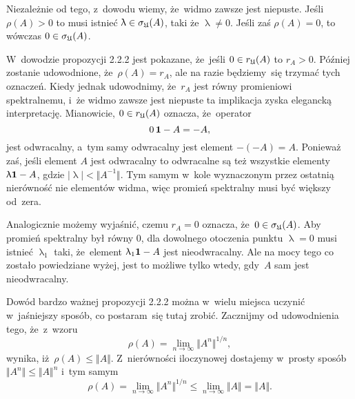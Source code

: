 \documentclass[a4paper,11pt]{article}
\renewcommand{\lambda}{\uplambda}
\begin{document}
Niezależnie od tego, z~dowodu wiemy, że~widmo zawsze jest niepuste. Jeśli
$\rho( A ) > 0$ to musi istnieć $\lambda \in \sigma_{ \Ufrak }( A )$, taki że $\lambda \neq 0$. Jeśli
zaś $\rho( A ) = 0$, to wówczas $0 \in \sigma_{ \mathfrak{U} }( A )$.

\VerSpaceFour





\noindent
{} W~dowodzie propozycji 2.2.2 jest pokazane, że~jeśli
$0 \in r_{ \mathfrak{U} }( A )$ to $r_{ A } > 0$. Później zostanie udowodnione,
że~$\rho( A ) = r_{ A }$, ale na razie będziemy~się trzymać tych oznaczeń.
Kiedy jednak udowodnimy, że~$r_{ A }$ jest równy promieniowi spektralnemu,
i~że widmo zawsze jest niepuste ta implikacja zyska elegancką interpretację.
Mianowicie, $0 \in r_{ \mathfrak{U} }( A )$ oznacza, że~operator
\begin{equation}
  \label{eq:Bratteli-Robinson-Operator-Algebras-ETC-Vol-I-s01-39}
  0 \, \mathbf{1} - A = -A,
\end{equation}
jest odwracalny, a~tym samy odwracalny jest element $-( -A ) = A$. Ponieważ
zaś, jeśli element $A$ jest odwracalny to odwracalne są też wszystkie
elementy $\lambda \UnitAlg - A$, gdzie $| \lambda | < \Vert A^{ -1 } \Vert$. Tym samym w~kole
wyznaczonym przez ostatnią nierówność nie elementów widma, więc promień
spektralny musi być większy od~zera.

Analogicznie możemy wyjaśnić, czemu $r_{ A } = 0$ oznacza,
że~$0 \in \sigma_{ \mathfrak{U} }( A )$. Aby promień spektralny był równy $0$, dla
dowolnego otoczenia punktu $\lambda = 0$ musi istnieć $\lambda_{ 1 }$ taki,
że~element $\lambda_{ 1 } \UnitAlg - A$ jest nieodwracalny. Ale na mocy tego co
zostało powiedziane wyżej, jest to możliwe tylko wtedy, gdy~$A$ sam jest
nieodwracalny.

\VerSpaceFour





\noindent
{} Dowód bardzo ważnej propozycji 2.2.2 można w~wielu miejsca
uczynić w~jaśniejszy sposób, co postaram~się tutaj zrobić. Zacznijmy od
udowodnienia tego, że~z~wzoru
\begin{equation}
  \label{eq:Bratteli-Robinson-Operator-Algebras-ETC-Vol-I-s01-40}
  \rho( A ) = \lim_{ n \to \infty } \Vert A^{ n } \Vert^{ 1 / n },
\end{equation}
wynika, iż~$\rho( A ) \leq \Vert A \Vert$. Z~nierówności iloczynowej dostajemy w~prosty
sposób $\Vert A^{ n } \Vert \leq \Vert A \Vert^{ n }$ i~tym samym
\begin{equation}
  \label{eq:Bratteli-Robinson-Operator-Algebras-ETC-Vol-I-s01-41}
  \rho( A ) =
  \lim_{ n \to \infty } \Vert A^{ n } \Vert^{ 1 / n } \leq
  \lim_{ n \to \infty } \Vert A \Vert = \Vert A \Vert.
\end{equation}
\end{document}
